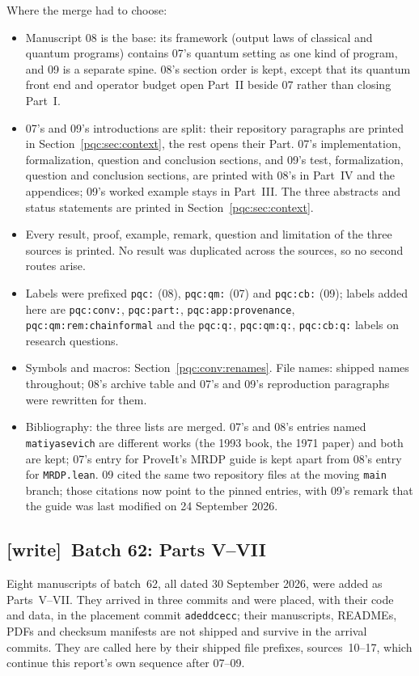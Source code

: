 \documentclass[11pt,letterpaper]{article}
\numberwithin{equation}{section}
\theoremstyle{definition}
\theoremstyle{remark}
\newcommand{\code}[1]{\nolinkurl{#1}}
\newcommand{\wtag}{\textup{[write]}}
\begin{document}
Where the merge had to choose:
\begin{itemize}
\item Manuscript 08 is the base: its framework (output laws of classical and
quantum programs) contains 07's quantum setting as one kind of program, and
09 is a separate spine. 08's section order is kept, except that its quantum
front end and operator budget open Part~II beside 07 rather than closing
Part~I.
\item 07's and 09's introductions are split: their repository paragraphs are
printed in Section~\ref{pqc:sec:context}, the rest opens their Part. 07's
implementation, formalization, question and conclusion sections, and 09's
test, formalization, question and conclusion sections, are printed with
08's in Part~IV and the appendices; 09's worked example stays in Part~III.
The three abstracts and status statements are printed in
Section~\ref{pqc:sec:context}.
\item Every result, proof, example, remark, question and limitation of the
three sources is printed. No result was duplicated across the sources, so
no second routes arise.
\item Labels were prefixed \code{pqc:} (08), \code{pqc:qm:} (07) and
\code{pqc:cb:} (09); labels added here are \code{pqc:conv:}, \code{pqc:part:},
\code{pqc:app:provenance}, \code{pqc:qm:rem:chainformal} and the
\code{pqc:q:}, \code{pqc:qm:q:}, \code{pqc:cb:q:} labels on research questions.
\item Symbols and macros: Section~\ref{pqc:conv:renames}. File names:
shipped names throughout; 08's archive table and 07's and 09's reproduction
paragraphs were rewritten for them.
\item Bibliography: the three lists are merged. 07's and 08's entries named
\code{matiyasevich} are different works (the 1993 book, the 1971 paper) and
both are kept; 07's entry for ProveIt's MRDP guide is kept apart from 08's
entry for \code{MRDP.lean}. 09 cited the same two repository files at the
moving \code{main} branch; those citations now point to the pinned entries,
with 09's remark that the guide was last modified on 24 September 2026.
\end{itemize}


\subsection{\wtag\ Batch 62: Parts V--VII}
\label{pqc:app:provenance62}
Eight manuscripts of batch~62, all dated 30 September 2026, were added as
Parts~V--VII. They arrived in three commits and were placed, with their code and
data, in the placement commit \code{adeddcecc}; their manuscripts, READMEs, PDFs
and checksum manifests are not shipped and survive in the arrival commits. They
are called here by their shipped file prefixes, sources~10--17, which continue
this report's own sequence after 07--09.
\end{document}
